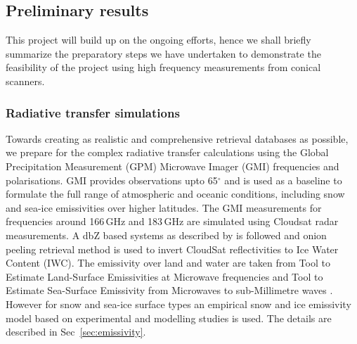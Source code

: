 \documentclass[12pt,oneside,a4paper]{article}
\begin{document}
\subsection{Preliminary results}
%
This project will build up on the ongoing efforts, hence we shall briefly summarize the preparatory steps we have undertaken to demonstrate the feasibility of the project using high frequency measurements from conical scanners.

\subsubsection{Radiative transfer simulations}
%
Towards creating as realistic and comprehensive retrieval databases as possible, we prepare for the complex radiative transfer calculations using the Global Precipitation Measurement (GPM) Microwave Imager (GMI) frequencies and polarisations. GMI provides observations upto 65$^{\circ}$ and is used as a baseline to formulate the full range of atmospheric and oceanic conditions, including snow and sea-ice emissivities over higher latitudes. The GMI measurements for frequencies around 166\,GHz and 183\,GHz are simulated using Cloudsat radar measurements. A dbZ based systems as described by \citet{ekelund:using:20} is followed and onion peeling retrieval method is used to invert CloudSat reflectivities to Ice Water Content (IWC). The emissivity over land and water are taken from Tool to Estimate Land-Surface Emissivities at Microwave frequencies \citep{aires} and Tool to Estimate Sea-Surface Emissivity from Microwaves to sub-Millimetre waves \citep{prigent}. However for snow and sea-ice surface types an empirical snow and ice emissivity model based on experimental and modelling studies is used. The details are described in Sec~\ref{sec:emissivity}.
\end{document}

